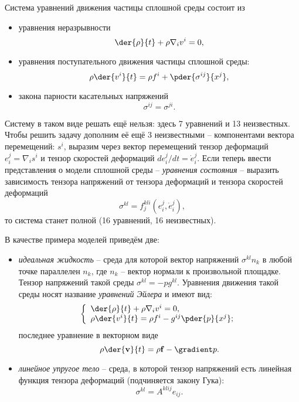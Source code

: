 
Система уравнений движения частицы сплошной среды состоит из
\begin{itemize}
\item уравнения неразрывности
\[
    \der{\rho }{t}+ \rho {\nabla_iv^i } = 0,
\]
\item уравнения поступательного движения частицы сплошной среды:
\[
    \rho  \der{v^i}{t}  = \rho f^i + \pder{ \sigma^{ij}}{x^j},
\]
\item закона парности касательных напряжений
\[
    \sigma^{ij} = \sigma^{ji}.
\]
\end{itemize}

Систему в таком виде решать ещё нельзя: здесь 7 уравнений и 13 неизвестных.
Чтобы решить задачу дополним её ещё 3 неизвестными -- компонентами вектора
перемещений: \( s^{i} \), выразим через вектор перемещений тензор деформаций
\( e^j_i  = \nabla_i s^i \) и тензор скоростей деформаций
\( {de^j_i}/{dt} = \dot{e}^j_i \). Если теперь ввести представления о модели
сплошной среды -- \emph{уравнения состояния} -- выразить зависимость тензора
напряжений от тензора деформаций и тензора скоростей деформаций
\[
    \sigma^{kl} = f^{kli}_j(e^j_i, \dot{e}^j_i),
\]
то система станет полной (16 уравнений, 16 неизвестных).

В качестве примера моделей приведём две:
\begin{itemize}
\item \emph{идеальная жидкость} -- среда для которой вектор напряжений
\( \sigma^{kl}n_k \) в любой точке параллелен \( n_k \), где \( n_k \) -- вектор
нормали к произвольной площадке. Тензор напряжений такой среды 
\( \sigma^{kl} = - p g^{kl} \). Уравнения движения такой среды носят название
\emph{уравнений Эйлера} и имеют вид:
\[
    \left\{\begin{array}{l}
    \der{\rho}{t} + \rho {\nabla_iv^i } = 0, \\
    \rho\der{v^i}{t}  = \rho f^i - g^{ij}\pder{p}{x^j};
    \end{array}\right.    
\]
последнее уравнение в векторном виде
\[
    \rho\der{\vec{v}}{t} = \rho\vec{f} - \gradient p.
\]

\item \emph{линейное упругое тело} -- среда, в которой тензор напряжений есть
линейная функция тензора деформаций (подчиняется закону Гука):
\[
    \sigma^{kl} = A^{klij}e_{ij}.
\]
\end{itemize}

\newpage
